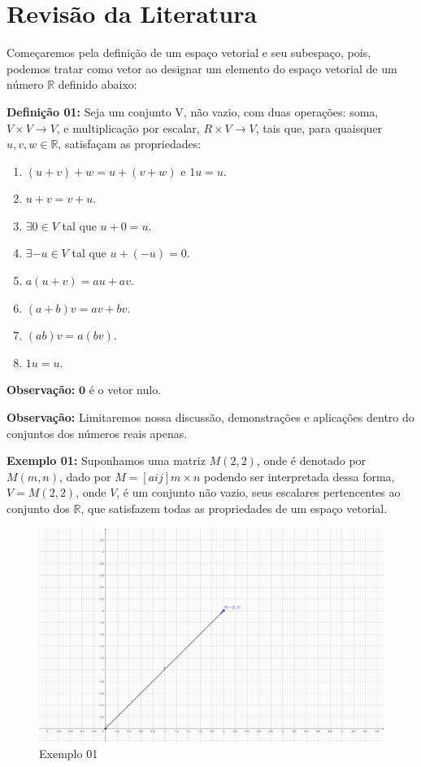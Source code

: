 \chapter{Revisão da Literatura}
Começaremos pela definição de um espaço vetorial e seu subespaço, pois, podemos tratar como vetor ao designar um elemento do espaço vetorial de um número $\mathbb{R}$ definido abaixo:

\noindent\textbf{Definição 01:} Seja um conjunto V, não vazio, com duas operações: soma, $V \times V \rightarrow V$, e multiplicação por escalar, $R \times V \rightarrow V$, tais que, para quaisquer $u, v, w \in \mathbb{R}$, satisfaçam as propriedades:
\begin{enumerate}
	\item $(u + v) + w = u + (v + w)$ e $1u = u$.
	\item $u + v = v + u$.
	\item $\exists 0 \in V$ tal que $u + 0 = u$.
	\item $\exists -u \in V$ tal que $u + (-u) = 0$.
	\item $a(u + v) = au + av$.
	\item $(a + b)v = av + bv$.
	\item $(ab)v = a(bv)$.
	\item $1u = u$.
\end{enumerate}

\noindent\textbf{Observação:} $\textbf{0}$ é o vetor nulo.

\noindent\textbf{Observação:} Limitaremos nossa discussão, demonstrações e aplicações dentro do conjuntos dos números reais apenas.

\noindent\textbf{Exemplo 01:} Suponhamos uma matriz $M(2, 2)$, onde é denotado por $M(m,n)$, dado por $M = [aij]m\times n$ podendo ser interpretada dessa forma, $V = M(2, 2)$, onde $V$, é um conjunto não vazio, seus escalares pertencentes ao conjunto dos $\mathbb{R}$, que satisfazem todas as propriedades de um espaço vetorial.

\begin{figure}
	\centering
	\includegraphics{exemplo01.png}
	\caption{Exemplo 01}
\end{figure}

